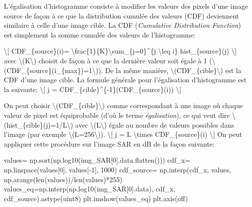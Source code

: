 \documentclass[
]{article}
\newenvironment{Shaded}{}{}
\newcommand{\BuiltInTok}[1]{\textcolor[rgb]{0.00,0.50,0.00}{#1}}
\newcommand{\DecValTok}[1]{\textcolor[rgb]{0.25,0.63,0.44}{#1}}
\newcommand{\NormalTok}[1]{#1}
\newcommand{\OperatorTok}[1]{\textcolor[rgb]{0.40,0.40,0.40}{#1}}
\newcommand{\StringTok}[1]{\textcolor[rgb]{0.25,0.44,0.63}{#1}}
\begin{document}
L'égalisation d'histogramme consiste à modifier les valeurs des pixels
d'une image source de façon à ce que la distribution cumulée des valeurs
(CDF) deviennent similaire à celle d'une image cible. La CDF
(\emph{Cumulative Distribution Function}) est simplement la somme
cumulée des valeurs de l'histogramme:

{\textbackslash{[} CDF\_\{source\}(i)=
\textbackslash frac\{1\}\{K\}\textbackslash sum\_\{j=0\}\^{}\{j
\textbackslash leq i\} hist\_\{source\}(j) \textbackslash{]}} avec
{\textbackslash(K\textbackslash)} choisit de façon à ce que la dernière
valeur soit égale à 1
({\textbackslash(CDF\_\{source\}(i\_\{max\})=1\textbackslash)}). De la
même manière, {\textbackslash(CDF\_\{cible\}\textbackslash)} est la CDF
d'une image cible. La formule générale pour l'égalisation d'histogramme
est la suivante: {\textbackslash{[} j =
CDF\_\{cible\}\^{}\{-1\}(CDF\_\{source\}(i)) \textbackslash{]}}

On peut choisir {\textbackslash(CDF\_\{cible\}\textbackslash)} comme
correspondant à une image où chaque valeur de pixel est équiprobable
(d'où le terme \emph{égalisation}), ce qui veut dire
{\textbackslash(hist\_\{cible\}(j)=1/L\textbackslash)} avec
{\textbackslash(L\textbackslash)} égale au nombre de valeurs possibles
dans l'image (par exemple {\textbackslash(L=256\textbackslash)}).
{\textbackslash{[} j = L \textbackslash times CDF\_\{source\}(i)
\textbackslash{]}} On peut appliquer cette procédure sur l'image SAR en
dB de la façon suivante:

\label{ce8cddaa}
\label{cb26}
\begin{Shaded}
\begin{Highlighting}[]
\NormalTok{values}\OperatorTok{=}\NormalTok{ np.sort(np.log10(img\_SAR[}\DecValTok{0}\NormalTok{].data.flatten()))}
\NormalTok{cdf\_x}\OperatorTok{=}\NormalTok{ np.linspace(values[}\DecValTok{0}\NormalTok{], values[}\OperatorTok{{-}}\DecValTok{1}\NormalTok{], }\DecValTok{1000}\NormalTok{)}
\NormalTok{cdf\_source}\OperatorTok{=}\NormalTok{ np.interp(cdf\_x, values, np.arange(}\BuiltInTok{len}\NormalTok{(values))}\OperatorTok{/}\BuiltInTok{len}\NormalTok{(values)}\OperatorTok{*}\DecValTok{255}\NormalTok{)}
\NormalTok{values\_eq}\OperatorTok{=}\NormalTok{np.interp(np.log10(img\_SAR[}\DecValTok{0}\NormalTok{].data), cdf\_x, cdf\_source).astype(}\StringTok{\textquotesingle{}uint8\textquotesingle{}}\NormalTok{)}
\NormalTok{plt.imshow(values\_eq)}
\NormalTok{plt.axis(}\StringTok{\textquotesingle{}off\textquotesingle{}}\NormalTok{)}
\end{Highlighting}
\end{Shaded}
\end{document}
